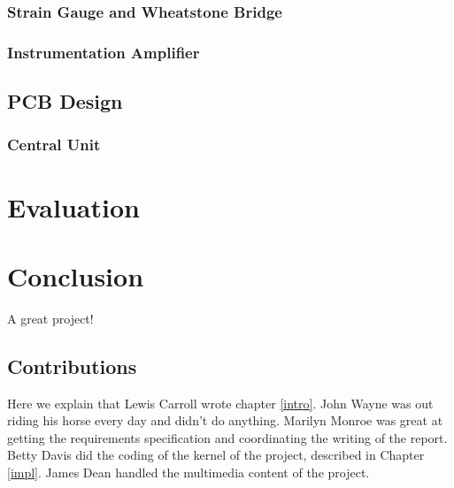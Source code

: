 \documentclass{l3proj}
\begin{document}
\subsection{Strain Gauge and Wheatstone Bridge}


\subsection{Instrumentation Amplifier}
\label{ina}

\section{PCB Design}
\label{pcb}

\subsection{Central Unit}

\chapter{Evaluation}

\chapter{Conclusion}

A great project!

\section{Contributions}

Here we explain that Lewis Carroll wrote chapter \ref{intro}. John Wayne
was out riding his horse every day and didn't do anything. Marilyn Monroe
was great at getting the requirements specification and coordinating the
writing of the report. Betty Davis did the coding of the kernel of the
project, described in Chapter \ref{impl}.  James Dean handled the
multimedia content of the project.



\end{document}
